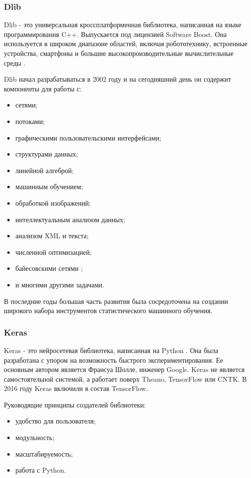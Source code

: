 \subsubsection{Dlib}

Dlib - это универсальная кроссплатформенная библиотека, написанная на языке программирования C++.  Выпускается под лицензией Software Boost.  Она используется в широком диапазоне областей, включая робототехнику, встроенные устройства, смартфоны и большие высокопроизводительные вычислительные среды \cite{dlib_doc}  . 

Dlib начал разрабатываться в 2002 году и на сегодняшний день он содержит компоненты для работы с:
\begin{itemize}
\item сетями;
\item потоками;
\item графическими пользовательскими интерфейсами;
\item структурами данных;
\item линейной алгеброй;
\item машинным обучением;
\item обработкой изображений;
\item интеллектуальным анализом данных;
\item анализом XML и текста;
\item численной оптимизацией;
\item байесовскими сетями ;
\item и многими другими задачами.
\end{itemize}

В последние годы большая часть развития была сосредоточена на создании широкого набора инструментов статистического машинного обучения.



\subsubsection{Keras}

Keras - это нейросетевая библиотека, написанная на Python \cite{Keras_doc} . Она была разработана с упором на возможность быстрого экспериментирования. Ее основным автором является Франсуа Шолле, инженер Google. Keras не является самостоятельной системой, а работает поверх Theano, TensorFlow или CNTK. В 2016 году Keras включили в состав TensorFlow.

Руководящие принципы создателей библиотеки:
\begin{itemize}
\item удобство для пользователя;
\item модульность;
\item масштабируемость;
\item работа с Python. 
\end{itemize}



